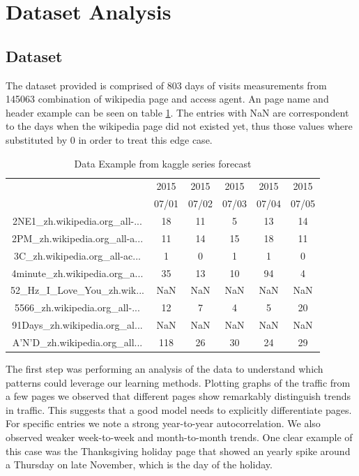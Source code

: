 \section{Dataset Analysis}

\subsection{Dataset}
The dataset provided is comprised of 803 days of visits measurements from 145063 combination of wikipedia page and access agent. An page name and header example can be seen on table \ref{tab:wiki_data}. The entries with NaN are correspondent to the days when the wikipedia page did not existed yet, thus those values where substituted by 0 in order to treat this edge case.

\begin{table}[htbp]
\centering
	\begin{tabular}{|c|c|c|c|c|c|}\hline
		& 2015 & 2015 & 2015 & 2015 & 2015 \\
		& 07/01 & 07/02 & 07/03 & 07/04 & 07/05\\ \hline
		2NE1\_zh.wikipedia.org\_all-...   & 18 & 11 & 5 & 13 & 14 \\\hline
		2PM\_zh.wikipedia.org\_all-a... & 11 & 14 & 15 & 18 & 11 \\\hline
		3C\_zh.wikipedia.org\_all-ac... & 1 & 0 & 1 & 1 & 0 \\ \hline
		4minute\_zh.wikipedia.org\_a...   & 35 & 13 & 10 & 94 & 4 \\\hline
		52\_Hz\_I\_Love\_You\_zh.wik... & NaN & NaN & NaN & NaN & NaN \\\hline
		5566\_zh.wikipedia.org\_all-... & 12 & 7 & 4 & 5 & 20 \\\hline
		91Days\_zh.wikipedia.org\_al... & NaN & NaN & NaN & NaN & NaN \\\hline
		A'N'D\_zh.wikipedia.org\_all... & 118 & 26 & 30 & 24 & 29\\\hline
	\end{tabular}
	\vspace{1mm}
		\caption{Data Example from kaggle series forecast\label{tab:wiki_data}}
\end{table}


The first step was performing an analysis of the data to understand which patterns could leverage our learning methods. Plotting graphs of the traffic from a few pages we observed that different pages show remarkably distinguish trends in traffic. This suggests that a good model needs to explicitly differentiate pages.
For specific entries we note a strong year-to-year autocorrelation. We also observed weaker week-to-week and month-to-month trends. One clear example of this case was the Thanksgiving holiday page that showed an yearly spike around a Thursday on late November, which is the day of the holiday.

